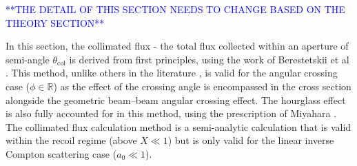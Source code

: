 \documentclass[../main.tex]{subfiles}
\begin{document}
\textcolor{blue}{**THE DETAIL OF THIS SECTION NEEDS TO CHANGE BASED ON THE THEORY SECTION**}

In this section, the collimated flux - the total flux collected within an aperture of semi-angle $\theta_{\mathrm{col}}$ is derived from first principles, using the work of Berestetskii et al \cite{berestetskii1982quantum}. This method, unlike others in the literature \cite{curatolo2017analytical}, is valid for the angular crossing case ($\phi\in\mathbb{R}$) as the effect of the crossing angle is encompassed in the cross section alongside the geometric beam--beam angular crossing effect. The hourglass effect is also fully accounted for in this method, using the prescription of Miyahara \cite{miyahara2008luminosity}. The collimated flux calculation method is a semi-analytic calculation that is valid within the recoil regime (above $X\ll1$) but is only valid for the linear inverse Compton scattering case ($a_{0}\ll1$).
\end{document}
